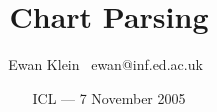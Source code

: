 % 
%
%
%
%
%
%
%
%
%
%
%
%
%
%
%
%
%
\title{Chart Parsing}
\author{Ewan Klein \newline \mbox{ }ewan@inf.ed.ac.uk\mbox{ }}
\date{ICL --- 7 November 2005}



\newcommand{\Rule}{\rule{\textwidth}{1pt}}
\newcommand{\SqB}[1]{[#1]}

\newcommand{\bigdot}{\mbox{\begin{scriptsize}{\ensuremath{\bullet}}\end{scriptsize}}}

\newcommand{\chdot}{\bigdot}





\usepackage{color}
\usepackage{amsmath}
\usepackage{graphicx}
\usepackage[plain]{algorithm}
% 

\newcommand{\Hilite}[1]{\colorbox{yellow}{#1}}
\newcommand{\Shade}[1]{\colorbox{light}{#1}}

\newcommand{\Em}[1]{\textcolor{red}{#1}}
\newcommand{\Dim}[1]{\textcolor{gray}{#1}}

\setlength{\parskip}{0in}
\setlength{\parindent}{0in}

